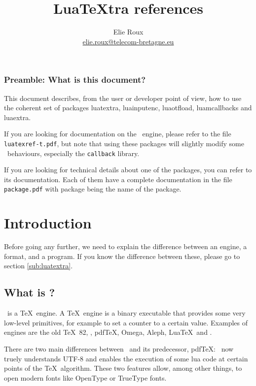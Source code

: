 \documentclass{article}
\title{Lua\TeX tra references}
\author{Elie Roux \\ \url{elie.roux@telecom-bretagne.eu}}
\makeatletter
\newlength\xxt@kern@Te
\newlength\xxt@kern@eX
\newlength\xxt@lower@e
\DeclareRobustCommand\XeTeX{%
  \leavevmode
  \smash{%
   X\lower\xxt@lower@e
   \hbox{\kern\xxt@kern@eX
   \setbox0=\hbox{E}\dimen0=\ht0\advance\dimen0by\dp0%
   \raise\dimen0\hbox{\rotatebox{180}{\box0}}%
   }\kern\xxt@kern@Te\TeX}}%
\makeatother
\begin{document}
\maketitle

\subsubsection*{Preamble: What is this document?}

This document describes, from the user or developer point of view, how to use the coherent set of packages \textsf{luatextra}, \textsf{luainputenc}, \textsf{luaotfload}, \textsf{luamcallbacks} and \textsf{luaextra}.

If you are looking for documentation on the \LuaTeX\ engine, please refer to the file \texttt{luatexref-t.pdf}, but note that using these packages will slightly modify some \LuaTeX\ behaviours, especially the \texttt{callback} library.

If you are looking for technical details about one of the packages, you can refer to its documentation. Each of them have a complete documentation in the file \texttt{package.pdf} with package being the name of the package.

\tableofcontents

\section{Introduction}

Before going any further, we need to explain the difference between an engine, a format, and a program. If you know the difference between these, please go to section \ref{sub:luatextra}.

\subsection{What is \LuaTeX ?}

\LuaTeX\ is a \TeX\ engine. A \TeX\ engine is a binary executable that provides some very low-level primitives, for example \texttt{\string\count} to set a counter to a certain value. Examples of engines are the old \TeX\ 82, \eTeX, pdf\TeX, Omega, Aleph, Lua\TeX\ and \XeTeX . 

There are two main differences between \LuaTeX\ and its predecessor, pdfTeX: \LuaTeX\ now truely understands UTF-8 and enables the execution of some lua code at certain points of the \TeX\ algorithm. These two features allow, among other things, to open modern fonts like OpenType or TrueType fonts.
\end{document}
